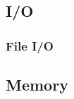 \documentclass[./LRM_main.tex]{subfiles}
\begin{document}
\subsection{I/O}
\begin{comment}
printf
formatting
verbs
user input
\end{comment}
\subsubsection{File I/O}
\subsection{Memory}


\end{document}
